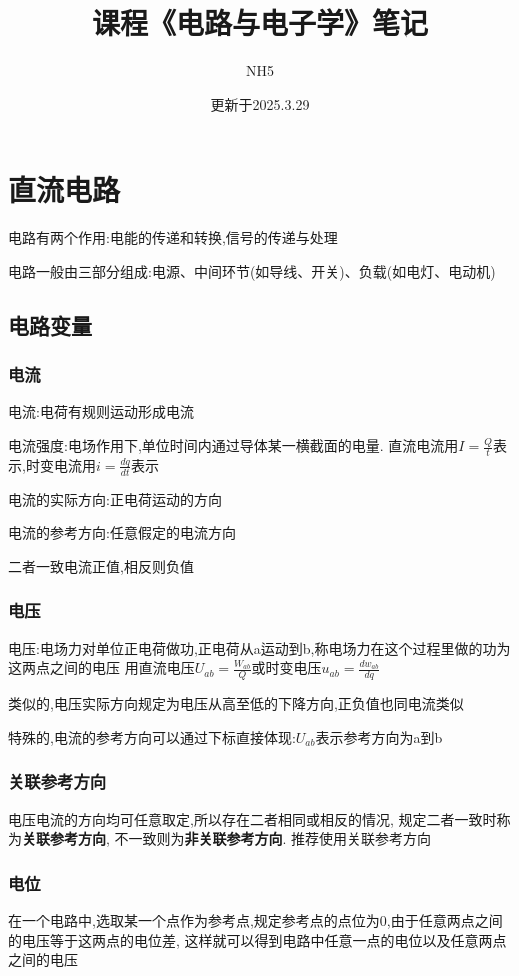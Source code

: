 \documentclass[12pt,a4paper,oneside]{ctexart}
\title{课程《电路与电子学》笔记}
\author{NH5}
\date{更新于2025.3.29}
\begin{document}
\maketitle
\section{直流电路}
电路有两个作用:电能的传递和转换,信号的传递与处理

电路一般由三部分组成:电源、中间环节(如导线、开关)、负载(如电灯、电动机)

\subsection{电路变量}
\subsubsection{电流}
电流:电荷有规则运动形成电流

电流强度:电场作用下,单位时间内通过导体某一横截面的电量.
直流电流用$I=\frac{Q}{t}$表示,时变电流用$i=\frac{dq}{dt}$表示

电流的实际方向:正电荷运动的方向

电流的参考方向:任意假定的电流方向

二者一致电流正值,相反则负值

\subsubsection{电压}
电压:电场力对单位正电荷做功,正电荷从a运动到b,称电场力在这个过程里做的功为这两点之间的电压
用直流电压$U_{ab}=\frac{W_{ab}}{Q}$或时变电压$u_{ab}=\frac{dw_{ab}}{dq}$

类似的,电压实际方向规定为电压从高至低的下降方向,正负值也同电流类似

特殊的,电流的参考方向可以通过下标直接体现:$U_{ab}$表示参考方向为a到b

\subsubsection{关联参考方向}
电压电流的方向均可任意取定,所以存在二者相同或相反的情况,
规定二者一致时称为\textbf{关联参考方向},
不一致则为\textbf{非关联参考方向}.
推荐使用关联参考方向

\subsubsection{电位}
在一个电路中,选取某一个点作为参考点,规定参考点的点位为0,由于任意两点之间的电压等于这两点的电位差,
这样就可以得到电路中任意一点的电位以及任意两点之间的电压
\end{document}
